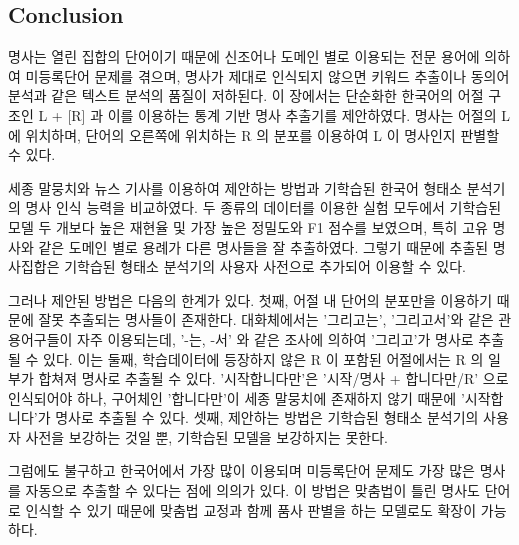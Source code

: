 \documentclass[11pt]{article}
\begin{document}
\subsection{Conclusion}
명사는 열린 집합의 단어이기 때문에 신조어나 도메인 별로 이용되는 전문 용어에 의하여 미등록단어 문제를 겪으며, 명사가 제대로 인식되지 않으면 키워드 추출이나 동의어 분석과 같은 텍스트 분석의 품질이 저하된다.
이 장에서는 단순화한 한국어의 어절 구조인 L + [R] 과 이를 이용하는 통계 기반 명사 추출기를 제안하였다.
명사는 어절의 L 에 위치하며, 단어의 오른쪽에 위치하는 R 의 분포를 이용하여 L 이 명사인지 판별할 수 있다.

세종 말뭉치와 뉴스 기사를 이용하여 제안하는 방법과 기학습된 한국어 형태소 분석기의 명사 인식 능력을 비교하였다.
두 종류의 데이터를 이용한 실험 모두에서 기학습된 모델 두 개보다 높은 재현율 및 가장 높은 정밀도와 F1 점수를 보였으며, 특히 고유 명사와 같은 도메인 별로 용례가 다른 명사들을 잘 추출하였다. 그렇기 때문에 추출된 명사집합은 기학습된 형태소 분석기의 사용자 사전으로 추가되어 이용할 수 있다.

그러나 제안된 방법은 다음의 한계가 있다.
첫째, 어절 내 단어의 분포만을 이용하기 때문에 잘못 추출되는 명사들이 존재한다.
대화체에서는 '그리고는', '그리고서'와 같은 관용어구들이 자주 이용되는데, '-는, -서' 와 같은 조사에 의하여 '그리고'가 명사로 추출될 수 있다.
이는 
둘째, 학습데이터에 등장하지 않은 R 이 포함된 어절에서는 R 의 일부가 합쳐져 명사로 추출될 수 있다.
'시작합니다만'은 '시작/명사 + 합니다만/R' 으로 인식되어야 하나, 구어체인 '합니다만'이 세종 말뭉치에 존재하지 않기 때문에 '시작합니다'가 명사로 추출될 수 있다.
셋째, 제안하는 방법은 기학습된 형태소 분석기의 사용자 사전을 보강하는 것일 뿐, 기학습된 모델을 보강하지는 못한다.

그럼에도 불구하고 한국어에서 가장 많이 이용되며 미등록단어 문제도 가장 많은 명사를 자동으로 추출할 수 있다는 점에 의의가 있다.
이 방법은 맞춤법이 틀린 명사도 단어로 인식할 수 있기 때문에 맞춤법 교정과 함께 품사 판별을 하는 모델로도 확장이 가능하다.
\end{document}

